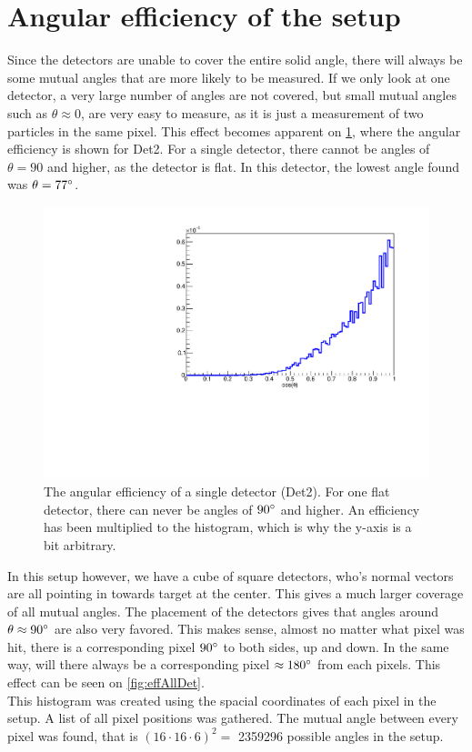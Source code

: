 \section{Angular efficiency of the setup}
Since the detectors are unable to cover the entire solid angle, there will always be some mutual angles that are more likely to be measured. 
If we only look at one detector, a very large number of angles are not covered, but small mutual angles such as $\theta \approx 0$, are very easy to measure, as it is just a measurement of two particles in the same pixel. 
This effect becomes apparent on \cref{fig:oneDetEff}, where the angular efficiency is shown for Det2. For a single detector, there cannot be angles of $\theta = 90$ and higher, as the detector is flat. In this detector, the lowest angle found was $\theta = 77\degree$.\\

\begin{figure}[h]
	\includegraphics[width=\linewidth]{../figures/det2Eff.pdf}
	\caption{The angular efficiency of a single detector (Det2). For one flat detector, there can never be angles of $90\degree$ and higher. An efficiency has been multiplied to the histogram, which is why the y-axis is a bit arbitrary.}
	\label{fig:oneDetEff}
\end{figure}
In this setup however, we have a cube of square detectors, who's normal vectors are all pointing in towards target at the center. This gives a much larger coverage of all mutual angles. 
The placement of the detectors gives that angles around $\theta \approx 90 \degree$ are also very favored. This makes sense, almost no matter what pixel was hit, there is a corresponding pixel $90\degree$ to both sides, up and down. In the same way, will there always be a corresponding pixel $\approx 180\degree$ from each pixels. This effect can be seen on \cref{fig:effAllDet}. \\
This histogram was created using the spacial coordinates of each pixel in the setup. A list of all pixel positions was gathered. The mutual angle between every pixel was found, that is $(16\cdot 16 \cdot 6)^2 =$ \num[group-separator={,}]{2359296} possible angles in the setup. 


